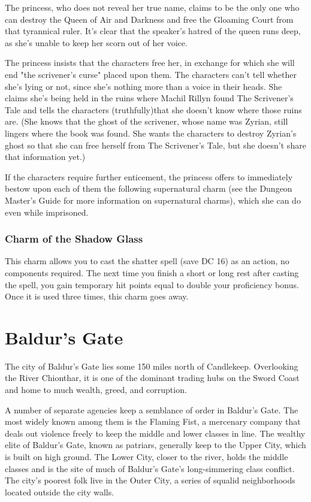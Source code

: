 \documentclass[10pt,a4paper,twoside,bg=print,twocolumn,openany,nodeprecatedcode]{dndbook}
\begin{document}
The princess, who does not reveal her true name, claims to be the only one who can destroy the Queen of Air and Darkness and free the Gloaming Court from that tyrannical ruler. It's clear that the speaker's hatred of the queen runs deep, as she's unable to keep her scorn out of her voice.

The princess insists that the characters free her, in exchange for which she will end "the scrivener's curse" placed upon them. The characters can't tell whether she's lying or not, since she's nothing more than a voice in their heads. She claims she's being held in the ruins where Machil Rillyn found The Scrivener's Tale and tells the characters (truthfully)that she doesn't know where those ruins are. (She knows that the ghost of the scrivener, whose name was Zyrian, still lingers where the book was found. She wants the characters to destroy Zyrian's ghost so that she can free herself from The Scrivener's Tale, but she doesn't share that information yet.)

If the characters require further enticement, the princess offers to immediately bestow upon each of them the following supernatural charm (see the Dungeon Master's Guide for more information on supernatural charms), which she can do even while imprisoned.

\subsubsection{Charm of the Shadow Glass}
This charm allows you to cast the shatter spell (save DC 16) as an action, no components required. The next time you finish a short or long rest after casting the spell, you gain temporary hit points equal to double your proficiency bonus. Once it is used three times, this charm goes away.

\section{Baldur's Gate}
The city of Baldur's Gate lies some 150 miles north of Candlekeep. Overlooking the River Chionthar, it is one of the dominant trading hubs on the Sword Coast and home to much wealth, greed, and corruption.

A number of separate agencies keep a semblance of order in Baldur's Gate. The most widely known among them is the Flaming Fist, a mercenary company that deals out violence freely to keep the middle and lower classes in line. The wealthy elite of Baldur's Gate, known as patriars, generally keep to the Upper City, which is built on high ground. The Lower City, closer to the river, holds the middle classes and is the site of much of Baldur's Gate's long-simmering class conflict. The city's poorest folk live in the Outer City, a series of squalid neighborhoods located outside the city walls.
\end{document}
